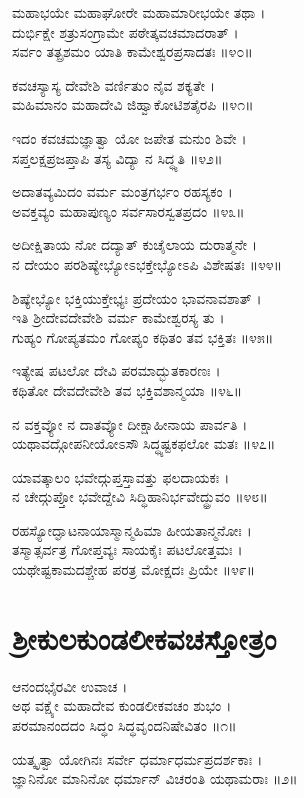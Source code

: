ಮಹಾಭಯೇ ಮಹಾಘೋರೇ ಮಹಾಮಾರೀಭಯೇ ತಥಾ ।\\
ದುರ್ಭಿಕ್ಷೇ ಶತ್ರುಸಂಗ್ರಾಮೇ ಪಠೇತ್ಕವಚಮಾದರಾತ್ ।\\
ಸರ್ವಂ ತತ್ಪ್ರಶಮಂ ಯಾತಿ ಕಾಮೇಶ್ವರಪ್ರಸಾದತಃ ॥೪೦॥

ಕವಚಸ್ಯಾಸ್ಯ ದೇವೇಶಿ ವರ್ಣಿತುಂ ನೈವ ಶಕ್ಯತೇ ।\\
ಮಹಿಮಾನಂ ಮಹಾದೇವಿ ಜಿಹ್ವಾಕೋಟಿಶತೈರಪಿ ॥೪೧॥

ಇದಂ ಕವಚಮಜ್ಞಾತ್ವಾ ಯೋ ಜಪೇತ ಮನುಂ ಶಿವೇ ।\\
ಸಪ್ತಲಕ್ಷಪ್ರಜಪ್ತಾಪಿ ತಸ್ಯ ವಿದ್ಯಾ ನ ಸಿದ್ಧ್ಯತಿ ॥೪೨॥

ಅದಾತವ್ಯಮಿದಂ ವರ್ಮ ಮಂತ್ರಗರ್ಭಂ ರಹಸ್ಯಕಂ ।\\
ಅವಕ್ತವ್ಯಂ ಮಹಾಪುಣ್ಯಂ ಸರ್ವಸಾರಸ್ವತಪ್ರದಂ ॥೪೩॥

ಅದೀಕ್ಷಿತಾಯ ನೋ ದದ್ಯಾತ್ ಕುಚೈಲಾಯ ದುರಾತ್ಮನೇ ।\\
ನ ದೇಯಂ ಪರಶಿಷ್ಯೇಭ್ಯೋಽಭಕ್ತೇಭ್ಯೋಽಪಿ ವಿಶೇಷತಃ ॥೪೪॥

ಶಿಷ್ಯೇಭ್ಯೋ ಭಕ್ತಿಯುಕ್ತೇಭ್ಯಃ ಪ್ರದೇಯಂ ಭಾವನಾವಶಾತ್ ।\\
ಇತಿ ಶ್ರೀದೇವದೇವೇಶಿ ವರ್ಮ ಕಾಮೇಶ್ವರಸ್ಯ ತು ।\\
ಗುಹ್ಯಂ ಗೋಪ್ಯತಮಂ ಗೋಪ್ಯಂ ಕಥಿತಂ ತವ ಭಕ್ತಿತಃ ॥೪೫॥

ಇತ್ಯೇಷ ಪಟಲೋ ದೇವಿ ಪರಮಾದ್ಭುತಕಾರಣಃ ।\\
ಕಥಿತೋ ದೇವದೇವೇಶಿ ತವ ಭಕ್ತಿವಶಾನ್ಮಯಾ ॥೪೬॥

ನ ವಕ್ತವ್ಯೋ ನ ದಾತವ್ಯೋ ದೀಕ್ಷಾಹೀನಾಯ ಪಾರ್ವತಿ ।\\
ಯಥಾವದ್ಗೋಪನೀಯೋಽಸೌ ಸಿದ್ಧ್ಯಷ್ಟಕಫಲೋ ಮತಃ ॥೪೭॥

ಯಾವತ್ಕಾಲಂ ಭವೇದ್ಗುಪ್ತಸ್ತಾವತ್ತು ಫಲದಾಯಕಃ ।\\
ನ ಚೇದ್ಗುಪ್ತೋ ಭವೇದ್ದೇವಿ ಸಿದ್ಧಿಹಾನಿರ್ಭವೇದ್ಧ್ರುವಂ ॥೪೮॥

ರಹಸ್ಯೋದ್ಘಾಟನಾಯಾಸ್ಮಾನ್ಮಹಿಮಾ ಹೀಯತಾನ್ಮನೋಃ ।\\
ತಸ್ಮಾತ್ಸರ್ವತ್ರ ಗೋಪ್ತವ್ಯಃ ಸಾಯಕೈಃ ಪಟಲೋತ್ತಮಃ ।\\
ಯಥೇಷ್ಟಕಾಮದಶ್ಚೇಹ ಪರತ್ರ ಮೋಕ್ಷದಃ ಪ್ರಿಯೇ ॥೪೯॥


\section{ಶ್ರೀಕುಲಕುಂಡಲೀಕವಚಸ್ತೋತ್ರಂ}

ಆನಂದಭೈರವೀ ಉವಾಚ ।\\
ಅಥ ವಕ್ಷ್ಯೇ ಮಹಾದೇವ ಕುಂಡಲೀಕವಚಂ ಶುಭಂ ।\\
ಪರಮಾನಂದದಂ ಸಿದ್ಧಂ ಸಿದ್ಧವೃಂದನಿಷೇವಿತಂ ॥೧॥

ಯತ್ಕೃತ್ವಾ ಯೋಗಿನಃ ಸರ್ವೇ ಧರ್ಮಾಧರ್ಮಪ್ರದರ್ಶಕಾಃ ।\\
ಜ್ಞಾನಿನೋ ಮಾನಿನೋ ಧರ್ಮಾನ್ ವಿಚರಂತಿ ಯಥಾಮರಾಃ ॥೨॥

